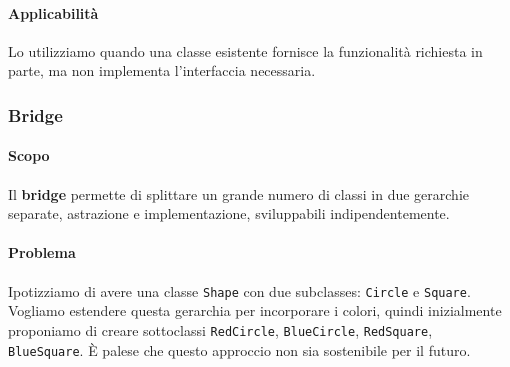 \documentclass[11pt]{article}
\newcommand{\code}[1]{\texttt{#1}}
\begin{document}
\paragraph{Applicabilità}
Lo utilizziamo quando una classe esistente fornisce la funzionalità richiesta in parte, ma non implementa l'interfaccia necessaria.

\subsubsection{Bridge}
\paragraph{Scopo}
Il \textbf{bridge} permette di splittare un grande numero di classi in due gerarchie separate, astrazione e implementazione, sviluppabili indipendentemente. 

\paragraph{Problema}
Ipotizziamo di avere una classe \code{Shape} con due subclasses: \code{Circle} e \code{Square}. Vogliamo estendere questa gerarchia per incorporare i colori, quindi inizialmente proponiamo di creare sottoclassi \code{RedCircle}, \code{BlueCircle}, \code{RedSquare}, \code{BlueSquare}. È palese che questo approccio non sia sostenibile per il futuro. 
\end{document}
